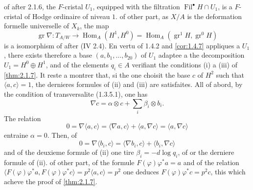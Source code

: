 \documentclass[12pt,a4paper]{article}
\theoremstyle{plain}
\theoremstyle{definition}
\theoremstyle{remark}
\DeclareMathOperator{\Fil}{Fil}
\DeclareMathOperator{\gr}{gr}
\DeclareMathOperator{\Hom}{Hom}
\providecommand{\Hom}{\operatorname{Hom}}
\begin{document}
of after 2.1.6, the $F$-cristal $U_1$, equipped with the filtration $\Fil^\bullet H \cap U_1$, is a $F$-cristal of Hodge ordinaire of niveau $1$. of other part, as $X/A$ is the deformation formelle universelle of $X_k$, the map
\[
\gr\nabla : T_{A/W} \longrightarrow \Hom_A(H^1, H^0) = \Hom_A(\gr^1 H, \gr^0 H)
\]
is a isomorphism of after (IV 2.4). En vertu of 1.4.2 and \ref{cor:1.4.7} appliques a $U_1$, there exists therefore a base $(a, b_1, \ldots, b_{20})$ of $U_1$ adaptee a the decomposition $U_1 = H^0 \oplus H^1$, and of the elements $q_i \in A$ verifiant the conditions (i) a (iii) of \ref{thm:2.1.7}. It reste a montrer that, si the one choisit the base $c$ of $H^2$ such that $\langle a, c \rangle = 1$, the dernieres formules of (ii) and (iii) are satisfaites. All of abord, by the condition of transversalite (1.3.5.1), one has
\[
\nabla c = \alpha \otimes c + \sum_i \beta_i \otimes b_i.
\]
The relation
\[
0 = \nabla\langle a, c \rangle = \langle \nabla a, c \rangle + \langle a, \nabla c \rangle = \langle a, \nabla c \rangle
\]
entraine $\alpha = 0$. Then, of
\[
0 = \nabla\langle b_i, c \rangle = \langle \nabla b_i, c \rangle + \langle b_i, \nabla c \rangle
\]
and of the deuxieme formule of (ii) one tire $\beta_i = -d\log q_i$, of or the derniere formule of (ii). of other part, of the formule $F(\varphi)\varphi^* a = a$ and of the relation $\langle F(\varphi)\varphi^* a, F(\varphi)\varphi^* c \rangle = p^2\langle a, c \rangle = p^2$ one deduces $F(\varphi)\varphi^* c = p^2 c$, this which acheve the proof of \ref{thm:2.1.7}.
\end{document}

